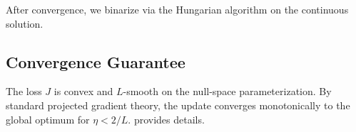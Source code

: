 After convergence, we binarize via the Hungarian algorithm on the 
continuous solution.

\subsection{Convergence Guarantee}

The loss $J$ is convex and $L$-smooth on the null-space parameterization. 
By standard projected gradient theory, the update converges 
monotonically to the global optimum for $\eta < 2/L$.  
provides details.